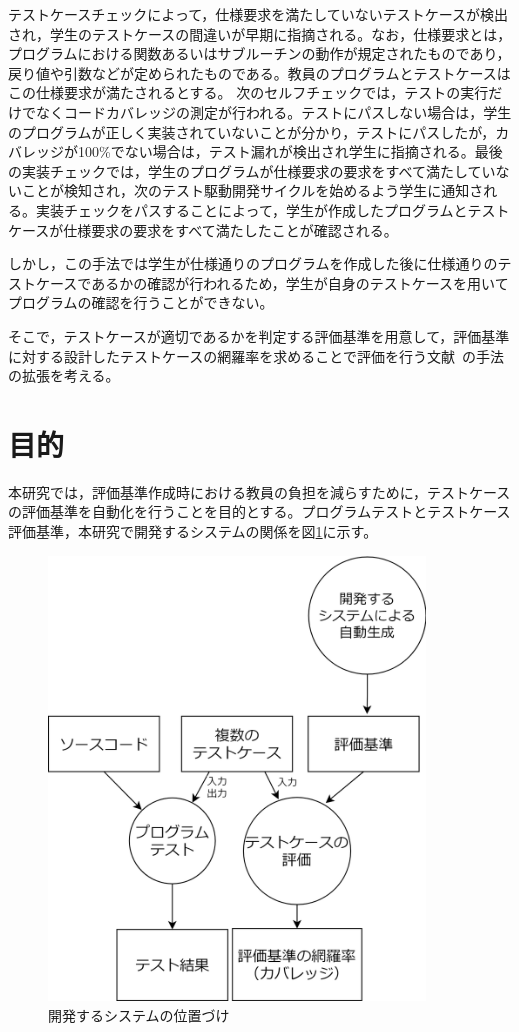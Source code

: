 \documentclass{tpu-sotu}
\begin{document}
テストケースチェックによって，仕様要求を満たしていないテストケースが検出され，学生のテストケースの間違いが早期に指摘される。なお，仕様要求とは，プログラムにおける関数あるいはサブルーチンの動作が規定されたものであり，戻り値や引数などが定められたものである。教員のプログラムとテストケースはこの仕様要求が満たされるとする。
次のセルフチェックでは，テストの実行だけでなくコードカバレッジの測定が行われる。テストにパスしない場合は，学生のプログラムが正しく実装されていないことが分かり，テストにパスしたが，カバレッジが100\%でない場合は，テスト漏れが検出され学生に指摘される。最後の実装チェックでは，学生のプログラムが仕様要求の要求をすべて満たしていないことが検知され，次のテスト駆動開発サイクルを始めるよう学生に通知される。実装チェックをパスすることによって，学生が作成したプログラムとテストケースが仕様要求の要求をすべて満たしたことが確認される。

しかし，この手法では学生が仕様通りのプログラムを作成した後に仕様通りのテストケースであるかの確認が行われるため，学生が自身のテストケースを用いてプログラムの確認を行うことができない。

そこで，テストケースが適切であるかを判定する評価基準を用意して，評価基準に対する設計したテストケースの網羅率を求めることで評価を行う文献~\cite{a1}の手法の拡張を考える。
\section{目的}
本研究では，評価基準作成時における教員の負担を減らすために，テストケースの評価基準を自動化を行うことを目的とする。プログラムテストとテストケース評価基準，本研究で開発するシステムの関係を図\ref{a3}に示す。

\begin{figure}[h]
  \centering
  \includegraphics[width=100mm]{300開発するシステムの位置づけ.png}
  \caption{開発するシステムの位置づけ}
  \label{a3}
\end{figure}
\end{document}
